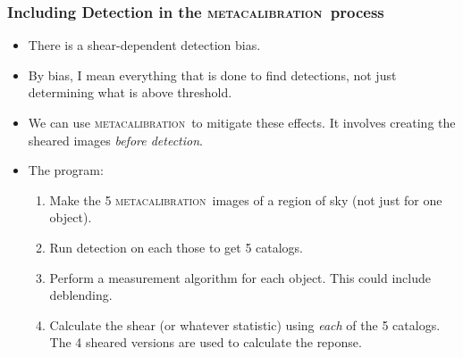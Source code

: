 \documentclass{beamer}
\newcommand{\mcal}{\textsc{metacalibration}}
\begin{document}
\frame
{
    \frametitle{Including Detection in the \mcal\ process}

 
    \begin{itemize}

        \item There is a {\color{lightsteelblue} shear-dependent detection bias}.

        \item By bias, I mean everything that is done to find detections,
            not just determining what is above threshold.

        \item We can use \mcal\ to mitigate these effects. It involves
            creating the sheared images {\color{lightsteelblue} {\em before detection}}.

        \item The program:
            \begin{enumerate}

                \item Make the 5 \mcal\ images of a region of sky (not just for
                    one object).

                \item Run detection on each those to get 5 catalogs.

                \item Perform a measurement algorithm for each object.  This
                    could include deblending.

                \item Calculate the shear (or whatever statistic) using {\em
                    each} of the 5 catalogs.  The 4 sheared versions are used
                    to calculate the reponse.

            \end{enumerate}

    \end{itemize}

}
\end{document}
